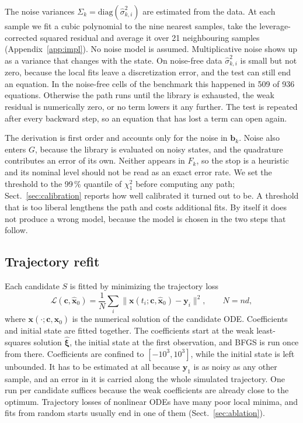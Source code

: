 \documentclass[10pt]{article}
\begin{document}
The noise variances $\Sigma_k=\mathrm{diag}(\hat\sigma^2_{k,i})$ are estimated from the data. At each sample we fit a
cubic polynomial to the nine nearest samples, take the leverage-corrected squared residual and average it over 21
neighbouring samples (Appendix~\ref{app:impl}). No noise model is assumed. Multiplicative noise shows up as a
variance that changes with the state. On noise-free data $\hat\sigma^2_{k,i}$ is small but not zero, because the local fits
leave a discretization error, and the test can still end an equation. In the noise-free cells of the benchmark this
happened in 509 of 936 equations.%
Otherwise the path runs until the library is exhausted, the weak residual is numerically zero, or no term lowers it
any further. The test is repeated after every backward step, so an equation that has lost a term can open again.

The derivation is first order and accounts only for the noise in $\bm b_k$. Noise also enters $G$, because the
library is evaluated on noisy states, and the quadrature contributes an error of its own. Neither appears in $F_k$,
so the stop is a heuristic and its nominal level should not be read as an exact error rate. We set the threshold to the
99\,\% quantile of $\chi^2_1$ before computing any path; Sect.~\ref{sec:calibration} reports how well calibrated it
turned out to be. A threshold that is too liberal lengthens the path and costs additional fits. By itself it does not
produce a wrong model, because the model is chosen in the two steps that follow.

\subsection{Trajectory refit}
Each candidate $S$ is fitted by minimizing the trajectory loss
\begin{equation}
\mathcal L(\bm c,\hat{\bm x}_0)=\frac1N\sum_i\big\lVert \bm x(t_i;\bm c,\hat{\bm x}_0)-\bm y_i\big\rVert^2,\qquad N=nd,
\end{equation}
where $\bm x(\cdot;\bm c,\hat{\bm x}_0)$ is the numerical solution of the candidate ODE. Coefficients and initial state
are fitted together. The coefficients start at the weak least-squares solution $\hat{\bm\xi}$, the initial state at
the first observation, and BFGS is run once from there. Coefficients are confined to $[-10^3,10^3]$, while the
initial state is left unbounded. It has to be estimated at all because $\bm y_1$ is as noisy as any other sample, and an error in it
is carried along the whole simulated trajectory. One run per candidate suffices because the weak coefficients are
already close to the optimum. Trajectory losses of nonlinear ODEs have many poor local minima, and fits from random
starts usually end in one of them (Sect.~\ref{sec:ablation}).
\end{document}

